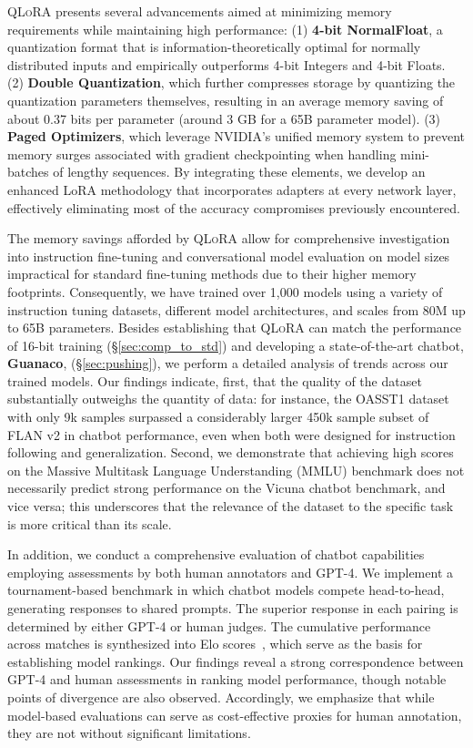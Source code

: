 \textsc{QLoRA} presents several advancements aimed at minimizing memory requirements while maintaining high performance: (1) \textbf{4-bit NormalFloat}, a quantization format that is information-theoretically optimal for normally distributed inputs and empirically outperforms 4-bit Integers and 4-bit Floats. (2) \textbf{Double Quantization}, which further compresses storage by quantizing the quantization parameters themselves, resulting in an average memory saving of about 0.37 bits per parameter (around 3 GB for a 65B parameter model). (3) \textbf{Paged Optimizers}, which leverage NVIDIA’s unified memory system to prevent memory surges associated with gradient checkpointing when handling mini-batches of lengthy sequences. By integrating these elements, we develop an enhanced LoRA methodology that incorporates adapters at every network layer, effectively eliminating most of the accuracy compromises previously encountered.

The memory savings afforded by \textsc{QLoRA} allow for comprehensive investigation into instruction fine-tuning and conversational model evaluation on model sizes impractical for standard fine-tuning methods due to their higher memory footprints. Consequently, we have trained over 1,000 models using a variety of instruction tuning datasets, different model architectures, and scales from 80M up to 65B parameters. Besides establishing that \textsc{QLoRA} can match the performance of 16-bit training (\S\ref{sec:comp_to_std}) and developing a state-of-the-art chatbot, \textbf{Guanaco}, (\S\ref{sec:pushing}), we perform a detailed analysis of trends across our trained models. Our findings indicate, first, that the quality of the dataset substantially outweighs the quantity of data: for instance, the OASST1 dataset with only 9k samples surpassed a considerably larger 450k sample subset of FLAN v2 in chatbot performance, even when both were designed for instruction following and generalization. Second, we demonstrate that achieving high scores on the Massive Multitask Language Understanding (MMLU) benchmark does not necessarily predict strong performance on the Vicuna chatbot benchmark, and vice versa; this underscores that the relevance of the dataset to the specific task is more critical than its scale.

In addition, we conduct a comprehensive evaluation of chatbot capabilities employing assessments by both human annotators and GPT-4. We implement a tournament-based benchmark in which chatbot models compete head-to-head, generating responses to shared prompts. The superior response in each pairing is determined by either GPT-4 or human judges. The cumulative performance across matches is synthesized into Elo scores~\citep{elo1967proposed, elo1978rating}, which serve as the basis for establishing model rankings. Our findings reveal a strong correspondence between GPT-4 and human assessments in ranking model performance, though notable points of divergence are also observed. Accordingly, we emphasize that while model-based evaluations can serve as cost-effective proxies for human annotation, they are not without significant limitations.

